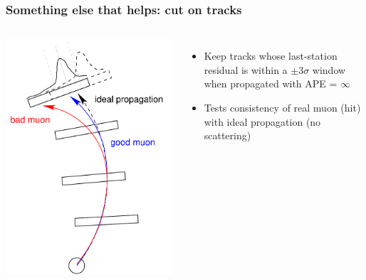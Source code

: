 \documentclass[compress]{beamer}
\begin{document}
\begin{frame}
\frametitle{Something else that helps: cut on tracks}
\begin{columns}
\includegraphics[width=1.1\linewidth]{trackcut.pdf}

\begin{itemize}
\item Keep tracks whose last-station residual is within a $\pm 3
\sigma$ window when propagated with APE = $\infty$

\item Tests consistency of real muon (hit) with ideal propagation (no scattering)
\end{itemize}


\end{columns}
\end{frame}
\end{document}
